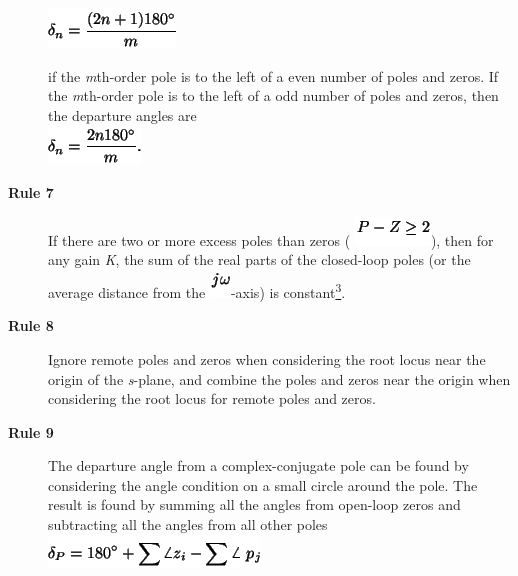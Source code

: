 \documentclass[16pt]{article}
\begin{document}
\begin{description}
	\includegraphics[width=1.33333in,height=0.41667in]{./The Root Locus Rules_files/img4.png}
	
	if the \emph{m}th-order pole is to the left of a even number of poles
	and zeros. If the \emph{m}th-order pole is to the left of a odd number
	of poles and zeros, then the departure angles are\\
	
	\includegraphics[width=0.96875in,height=0.40625in]{./The Root Locus Rules_files/img5.png}
	\item[\textbf{Rule 7} ]
	If there are two or more excess poles than zeros (
	\includegraphics[width=0.79167in,height=0.30208in]{./The Root Locus Rules_files/img6.png}),
	then for any gain \emph{K}, the sum of the real parts of the closed-loop
	poles (or the average distance from the
	\includegraphics[width=0.21875in,height=0.29167in]{./The Root Locus Rules_files/img7.png}-axis)
	is
	constant\href{http://www.mit.edu/people/klund/weblatex/footnode.html\#foot2284}{\textsuperscript{3}}.
	\item[\textbf{Rule 8} ]
	Ignore remote poles and zeros when considering the root locus near the
	origin of the \emph{s}-plane, and combine the poles and zeros near the
	origin when considering the root locus for remote poles and zeros.
	\item[\textbf{Rule 9} ]
	The departure angle from a complex-conjugate pole can be found by
	considering the angle condition on a small circle around the pole. The
	result is found by summing all the angles from open-loop zeros and
	subtracting all the angles from all other poles\\
	
	\includegraphics[width=2.20833in,height=0.34375in]{./The Root Locus Rules_files/img8.png}
	

\end{description}
\end{document}

